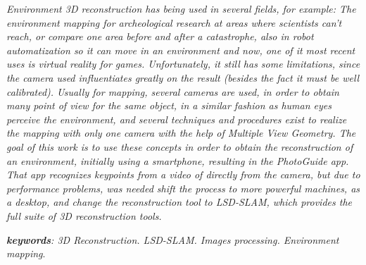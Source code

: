 \setlength{\absparsep}{18pt} %
\begin{resumo}[Abstract]
\textit{Environment 3D reconstruction has being used in several fields, for example: The environment mapping for archeological research at areas where scientists can't reach, or compare one area before and after a catastrophe\cite{SLAMAP}, also in robot automatization so it can move in an environment and now, one of it most recent uses is virtual reality for games. Unfortunately, it still has some limitations, since the camera used influentiates greatly on the result (besides the fact it must be well calibrated). Usually for mapping, several cameras are used, in order to obtain many point of view for the same object, in a similar fashion as human eyes perceive the environment, and several techniques and procedures exist to realize the mapping with only one camera with the help of Multiple View Geometry. The goal of this work is to use these concepts in order to obtain the reconstruction of an environment, initially using a smartphone, resulting in the PhotoGuide app. That app recognizes keypoints from a video of directly from the camera, but due to performance problems, was needed shift the process to more powerful machines, as a desktop, and change the reconstruction tool to LSD-SLAM, which provides the full suite of 3D reconstruction tools.}


\textit{\textbf{keywords}: 3D Reconstruction. LSD-SLAM. Images processing. Environment mapping}.
\end{resumo}